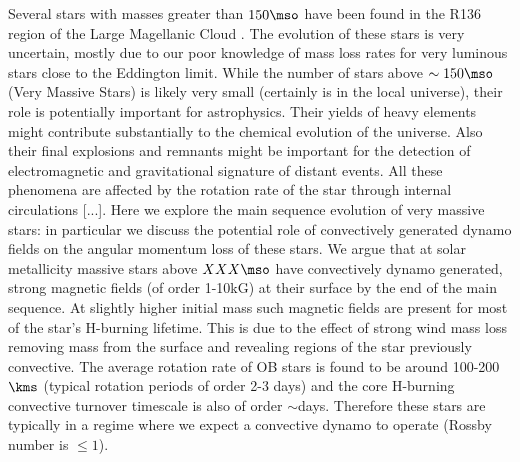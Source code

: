 Several stars with masses greater than $150\mso$ have been found in the R136 region of the Large Magellanic Cloud  \cite{sof_Parker_Goodwin_Kassim_2010}. The evolution of these stars is very uncertain, mostly due to our poor knowledge of mass loss rates for very luminous stars close to the Eddington limit. While the number of stars above $\sim 150\mso$ (Very Massive Stars) is likely very small (certainly is in the local universe), their role is potentially important for astrophysics. Their yields of heavy elements might contribute substantially to the chemical evolution of the universe. Also their final explosions and remnants might be important for the detection of electromagnetic and gravitational signature of distant events. All these phenomena are affected by the rotation rate of the star through internal circulations [...]. Here we explore the main sequence evolution of very massive stars: in particular we discuss the potential role of convectively generated dynamo fields on the angular momentum loss of these stars. We argue that at solar metallicity massive stars above $XXX\mso$ have convectively dynamo generated, strong magnetic fields (of order 1-10kG) at their surface by the end of the main sequence. At slightly higher initial mass such magnetic fields are present for most of the star's H-burning lifetime. This is due to the effect of strong wind mass loss removing mass from the surface and revealing regions of the star previously convective. The average rotation rate of OB stars is found to be around 100-200$\kms$ (typical rotation periods of order 2-3 days) and the core H-burning convective turnover timescale is also of order $\sim$days. Therefore these stars are typically in a regime where we expect a convective dynamo to operate (Rossby number is $\le 1$).